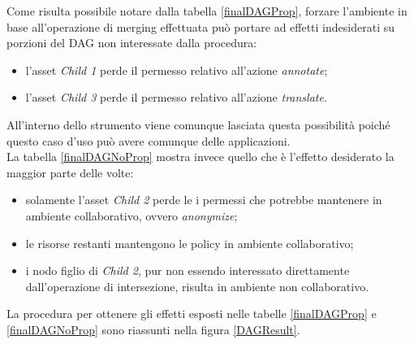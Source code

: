\documentclass[12pt,a4paper,twoside]{book}
\begin{document}
Come risulta possibile notare dalla tabella \ref{finalDAGProp}, forzare l'ambiente in base all'operazione di merging effettuata può portare ad effetti indesiderati su porzioni del DAG non interessate dalla procedura:
\begin{itemize}
\item l'asset \textit{Child 1} perde il permesso relativo all'azione \textit{annotate};
\item l'asset \textit{Child 3} perde il permesso relativo all'azione \textit{translate}.
\end{itemize}
All'interno dello strumento viene comunque lasciata questa possibilità poiché questo caso d'uso può avere comunque delle applicazioni.\\
La tabella \ref{finalDAGNoProp} mostra invece quello che è l'effetto desiderato la maggior parte delle volte:
\begin{itemize}
\item solamente l'asset \textit{Child 2} perde le i permessi che potrebbe mantenere in ambiente collaborativo, ovvero \textit{anonymize};
\item le risorse restanti mantengono le policy in ambiente collaborativo;
\item i nodo figlio di \textit{Child 2}, pur non essendo interessato direttamente dall'operazione di intersezione, risulta in ambiente non collaborativo.
\end{itemize}
La procedura per ottenere gli effetti esposti nelle tabelle \ref{finalDAGProp} e \ref{finalDAGNoProp} sono riassunti nella figura \ref{DAGResult}. 
\end{document}

